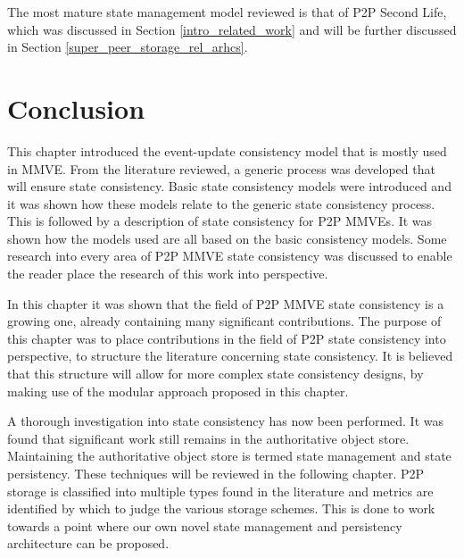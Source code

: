 The most mature state management model reviewed is that of P2P Second Life, which was discussed in Section \ref{intro_related_work} and will be further discussed in Section \ref{super_peer_storage_rel_arhcs}.

\section{Conclusion}

This chapter introduced the event-update consistency model that is mostly used in MMVE. From the literature reviewed, a generic process was developed that will ensure state consistency. Basic state consistency models were introduced and it was shown how these models relate to the generic state consistency process. This is followed by a description of state consistency for P2P MMVEs. It was shown how the models used are all based on the basic consistency models. Some research into every area of P2P MMVE state consistency was discussed to enable the reader place the research of this work into perspective.

In this chapter it was shown that the field of P2P MMVE state consistency is a growing one, already containing many significant contributions. The purpose of this chapter was to place contributions in the field of P2P state consistency into perspective, to structure the literature concerning state consistency. It is believed that this structure will allow for more complex state consistency designs, by making use of the modular approach proposed in this chapter.

A thorough investigation into state consistency has now been performed. It was found that significant work still remains in the authoritative object store. Maintaining the authoritative object store is termed state management and state persistency. These techniques will be reviewed in the following chapter. P2P storage is classified into multiple types found in the literature and metrics are identified by which to judge the various storage schemes. This is done to work towards a point where our own novel state management and persistency architecture can be proposed.
